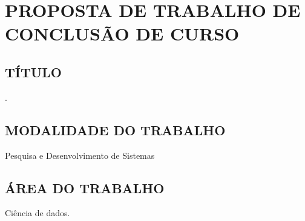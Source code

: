
\chapter{PROPOSTA DE TRABALHO DE CONCLUSÃO DE CURSO}
\label{chap:proposta}

\section{TÍTULO}
\label{sec:titulo}
\thetitle.

\section{MODALIDADE DO TRABALHO}
\label{sec:modalidade}
Pesquisa e Desenvolvimento de Sistemas

\section{ÁREA DO TRABALHO}
\label{sec:area}
Ciência de dados.

